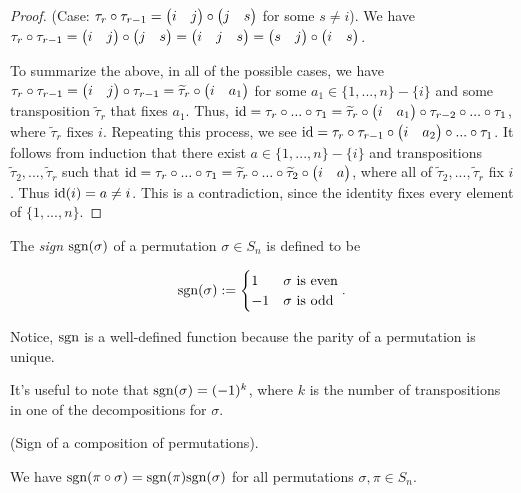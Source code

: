 \begin{proof}
{{            \fullindent
            {
                (Case: $\tau_r \circ \tau_{r - 1} = \begin{pmatrix} i & j \end{pmatrix} \circ \begin{pmatrix} j & s \end{pmatrix}$ for some $s \neq i$). We have $\tau_r \circ \tau_{r - 1} = \begin{pmatrix} i & j \end{pmatrix} \circ \begin{pmatrix} j & s \end{pmatrix} = \begin{pmatrix} i & j & s \end{pmatrix} = \begin{pmatrix} s & j \end{pmatrix} \circ \begin{pmatrix} i & s \end{pmatrix}$.
            }
        }
    }

    \newcommand{\tttau}{\widetilde{\tau}}
            
    To summarize the above, in all of the possible cases, we have $\tau_r \circ \tau_{r - 1} = \transp{i}{j} \circ \tau_{r - 1} = \tttau_r \circ \transp{i}{a_1}$ for some $a_1 \in \{1, ..., n\} - \{i\}$ and some transposition $\tttau_r$ that fixes $a_1$. Thus, $\id = \tau_r \circ ... \circ \tau_1 = \tttau_r \circ \transp{i}{a_1} \circ \tau_{r - 2} \circ ... \circ \tau_1$, where $\tttau_r$ fixes $i$. Repeating this process, we see $\text{id} = \tau_r \circ \tau_{r - 1} \circ \begin{pmatrix} i & a_2 \end{pmatrix} \circ ... \circ \tau_1$. It follows from induction that there exist $a \in \{1, ..., n\} - \{i\}$ and transpositions $\tttau_2, ..., \tttau_r$ such that $\id = \tau_r \circ ... \circ \tau_1 = \tttau_r \circ ... \circ \tttau_2 \circ \transp{i}{a}$, where all of $\tttau_2, ..., \tttau_r$ fix $i$. Thus $\text{id}(i) = a \neq i$. This is a contradiction, since the identity fixes every element of $\{1, ..., n\}$.
\end{proof}

\begin{defn}
    The \textit{sign} $\text{sgn}(\sigma)$ of a permutation $\sigma \in S_n$ is defined to be
    
    \begin{align*}
        \text{sgn}(\sigma) := 
        \begin{cases}
            1 & \text{$\sigma$ is even} \\
            -1 & \text{$\sigma$ is odd}
        \end{cases}.
    \end{align*}

    Notice, $\text{sgn}$ is a well-defined function because the parity of a permutation is unique.

    It's useful to note that $\text{sgn}(\sigma) = (-1)^k$, where $k$ is the number of transpositions in one of the decompositions for $\sigma$.
\end{defn}

\begin{theorem}
    (Sign of a composition of permutations).

    We have $\text{sgn}(\pi \circ \sigma) = \text{sgn}(\pi) \text{sgn}(\sigma)$ for all permutations $\sigma, \pi \in S_n$.
\end{theorem}

